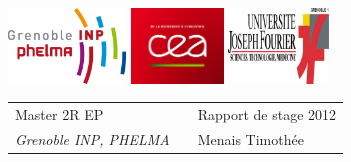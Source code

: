 \documentclass[a4paper,11pt]{article}
\begin{document}
\setlength{\parindent}{0pt}

\thispagestyle{empty}

\includegraphics[height=2cm]{phelma.jpg} \hfill \includegraphics[height=2cm]{cea2.png} \hfill \includegraphics[height=2cm]{ujf.jpg}

\vspace{0.5cm}

\begin{tabularx}{\textwidth}{@{} l X l @{} }
{\sc Master  2R EP} & & Rapport de stage 2012 \\
{\it Grenoble INP, PHELMA} & & Menais Timothée \\

\end{tabularx}
\end{document}
